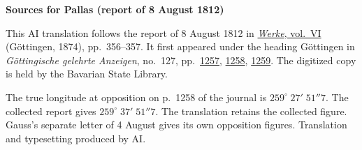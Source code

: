 \clearpage\thispagestyle{empty}
\begin{center}\textbf{Sources for Pallas (report of 8 August 1812)}\end{center}
\noindent This AI translation follows the report of 8 August 1812 in \href{https://gdz.sub.uni-goettingen.de/id/PPN236007467}{\textit{Werke}, vol.~VI} (Göttingen, 1874), pp.~356--357. It first appeared under the heading Göttingen in \textit{Göttingische gelehrte Anzeigen}, no.~127, pp.~\href{https://api.digitale-sammlungen.de/iiif/image/v2/bsb10538682_00223/full/1600,/0/default.jpg}{1257}, \href{https://api.digitale-sammlungen.de/iiif/image/v2/bsb10538682_00224/full/1600,/0/default.jpg}{1258}, \href{https://api.digitale-sammlungen.de/iiif/image/v2/bsb10538682_00225/full/1600,/0/default.jpg}{1259}. The digitized copy is held by the Bavarian State Library.
\par\smallskip\noindent The true longitude at opposition on p.~1258 of the journal is $259^\circ\;27'\;51''7$. The collected report gives $259^\circ\;37'\;51''7$. The translation retains the collected figure. Gauss’s separate letter of 4 August gives its own opposition figures. Translation and typesetting produced by AI.
\clearpage
